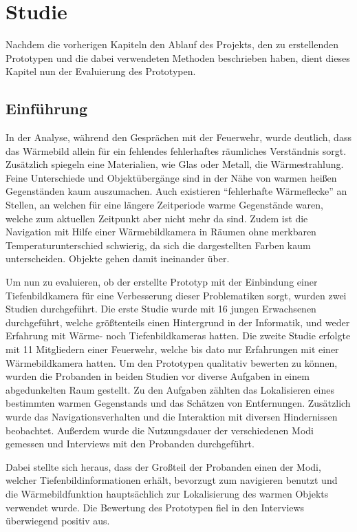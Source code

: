 
\chapter{Studie}
\label{chap:study}

Nachdem die vorherigen Kapiteln den Ablauf des Projekts, den zu erstellenden Prototypen und die dabei verwendeten Methoden beschrieben haben, dient dieses Kapitel nun der Evaluierung des Prototypen.

\section{Einführung}
In der Analyse, während den Gesprächen mit der Feuerwehr, wurde deutlich, dass das Wärmebild allein für ein fehlendes \bzw fehlerhaftes räumliches Verständnis sorgt.
Zusätzlich spiegeln eine Materialien, wie Glas oder Metall, die Wärmestrahlung.
Feine Unterschiede und Objektübergänge sind in der Nähe von warmen \bzw heißen Gegenständen kaum auszumachen.
Auch existieren \enquote{fehlerhafte Wärmeflecke} an Stellen, an welchen für eine längere Zeitperiode warme Gegenstände waren, welche zum aktuellen Zeitpunkt aber nicht mehr da sind.
Zudem ist die Navigation mit Hilfe einer Wärmebildkamera in Räumen ohne merkbaren Temperaturunterschied schwierig, da sich die dargestellten Farben kaum unterscheiden.
Objekte gehen damit ineinander über.

Um nun zu evaluieren, ob der erstellte Prototyp mit der Einbindung einer Tiefenbildkamera für eine Verbesserung dieser Problematiken sorgt, wurden zwei Studien durchgeführt.
Die erste Studie wurde mit 16 jungen Erwachsenen durchgeführt, welche größtenteils einen Hintergrund in der Informatik, und weder Erfahrung mit Wärme- noch Tiefenbildkameras hatten.
Die zweite Studie erfolgte mit 11 Mitgliedern einer Feuerwehr, welche bis dato nur Erfahrungen mit einer Wärmebildkamera hatten.
Um den Prototypen qualitativ bewerten zu können, wurden die Probanden in beiden Studien vor diverse Aufgaben in einem abgedunkelten Raum gestellt.
Zu den Aufgaben zählten das Lokalisieren eines bestimmten warmen Gegenstands und das Schätzen von Entfernungen.
Zusätzlich wurde das Navigationsverhalten und die Interaktion mit diversen Hindernissen beobachtet.
Außerdem wurde die Nutzungsdauer der verschiedenen Modi gemessen und Interviews mit den Probanden durchgeführt.

Dabei stellte sich heraus, dass der Großteil der Probanden einen der Modi, welcher Tiefenbildinformationen erhält, bevorzugt zum navigieren benutzt und die Wärmebildfunktion hauptsächlich zur Lokalisierung des warmen Objekts verwendet wurde.
Die Bewertung des Prototypen fiel in den Interviews überwiegend positiv aus.

